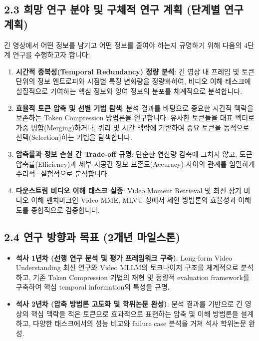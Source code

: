 \documentclass[10pt, a4paper, twocolumn]{article}
\begin{document}
\subsection{2.3 희망 연구 분야 및 구체적 연구 계획 (단계별 연구 계획)}
긴 영상에서 어떤 정보를 남기고 어떤 정보를 줄여야 하는지 규명하기 위해 다음의 4단계 연구를 수행하고자 합니다:

\begin{enumerate}
    \item \textbf{시간적 중복성(Temporal Redundancy) 정량 분석}: 긴 영상 내 프레임 및 토큰 단위의 정보 엔트로피와 시점별 특징 변화량을 정량화하여, 비디오 이해 태스크에 실질적으로 기여하는 핵심 정보와 잉여 정보의 분포를 체계적으로 분석합니다.
    \item \textbf{효율적 토큰 압축 및 선별 기법 탐색}: 분석 결과를 바탕으로 중요한 시간적 맥락을 보존하는 Token Compression 방법론을 연구합니다. 유사한 토큰들을 대표 벡터로 가중 병합(Merging)하거나, 쿼리 및 시간 맥락에 기반하여 중요 토큰을 동적으로 선택(Selection)하는 기법을 탐색합니다.
    \item \textbf{압축률과 정보 손실 간 Trade-off 규명}: 단순한 연산량 감축에 그치지 않고, 토큰 압축률(Efficiency)과 세부 시공간 정보 보존도(Accuracy) 사이의 관계를 엄밀하게 수리적·실험적으로 분석합니다.
    \item \textbf{다운스트림 비디오 이해 태스크 실증}: Video Moment Retrieval 및 최신 장기 비디오 이해 벤치마크인 Video-MME, MLVU 상에서 제안 방법론의 효율성과 이해도를 종합적으로 검증합니다.
\end{enumerate}

\subsection{2.4 연구 방향과 목표 (2개년 마일스톤)}
\begin{itemize}
    \item \textbf{석사 1년차 (선행 연구 분석 및 평가 프레임워크 구축)}: Long-form Video Understanding 최신 연구와 Video MLLM의 토크나이저 구조를 체계적으로 분석하고, 기존 Token Compression 기법의 재현 및 정량적 evaluation framework를 구축하여 핵심 temporal information의 특성을 규명.
    \item \textbf{석사 2년차 (압축 방법론 고도화 및 학위논문 완성)}: 분석 결과를 기반으로 긴 영상의 핵심 맥락을 적은 토큰으로 효과적으로 표현하는 압축 및 이해 방법론을 설계하고, 다양한 태스크에서의 성능 비교와 failure case 분석을 거쳐 석사 학위논문 완성.
\end{itemize}
\end{document}
